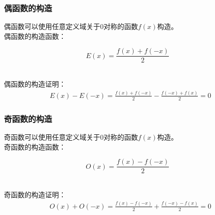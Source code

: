 \documentclass[UTF8]{ctexart}
\begin{document}
\newpage

\subsubsection{偶函数的构造}
    \setcounter{equation}{0}
    偶函数可以使用任意定义域关于$0$对称的函数$f(x)$构造。\\[3mm]
    偶函数的构造函数：
    \begin{large}
        \begin{equation*}
            E(x)=\frac{f(x)+f(-x)}{2}
        \end{equation*}
    \end{large}\\
    偶函数的构造证明：
    \begin{align}
        &E(x)-E(-x)=\frac{f(x)+f(-x)}{2}-\frac{f(-x)+f(x)}{2}=0
    \end{align}\vspace{-15pt}

\subsubsection{奇函数的构造}
    \setcounter{equation}{0}
    奇函数可以使用任意定义域关于$0$对称的函数$f(x)$构造。\\[3mm]
    奇函数的构造函数：
    \begin{large}
        \begin{equation*}
            O(x)=\frac{f(x)-f(-x)}{2}
        \end{equation*}
    \end{large}\\
    奇函数的构造证明：
    \begin{align}
        &O(x)+O(-x)=\frac{f(x)-f(-x)}{2}+\frac{f(-x)-f(x)}{2}=0
    \end{align}\vspace{-5pt}
\end{document}
